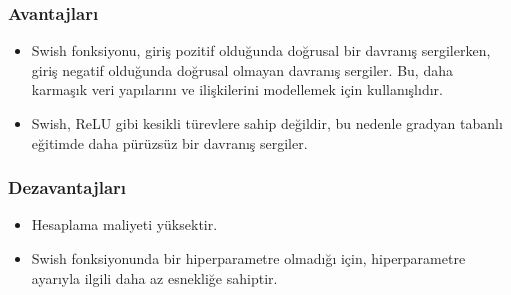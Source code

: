 \subsubsection{Avantajları}
\begin{itemize}
    \item Swish fonksiyonu, giriş pozitif olduğunda doğrusal bir davranış sergilerken, giriş negatif olduğunda doğrusal olmayan davranış sergiler. Bu, daha karmaşık veri yapılarını ve ilişkilerini modellemek için kullanışlıdır.
    \item Swish, ReLU gibi kesikli türevlere sahip değildir, bu nedenle gradyan tabanlı eğitimde daha pürüzsüz bir davranış sergiler.
\end{itemize}

\subsubsection{Dezavantajları}
\begin{itemize}
    \item Hesaplama maliyeti yüksektir.
    \item Swish fonksiyonunda bir hiperparametre olmadığı için, hiperparametre ayarıyla ilgili daha az esnekliğe sahiptir.
\end{itemize}

\newpage